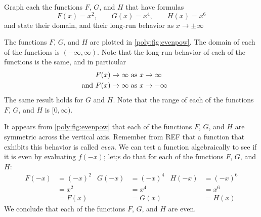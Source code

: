 \begin{pccexample}\label{poly:ex:evenpow}%
	Graph each the functions $F$, $G$, and $H$ that 
	have formulas
	\[
		F(x)=x^2, \qquad G(x)=x^4, \qquad H(x)=x^6
	\]
	and  state their domain, and their long-run behavior as $x\rightarrow\pm\infty$
	\begin{pccsolution}
		The functions $F$, $G$, and $H$ are plotted in \cref{poly:fig:evenpow}. The domain
		of each of the functions is $(-\infty,\infty)$. Note that the long-run behavior 
		of each of the functions is the same, and in particular
		\begin{align*}
			F(x)\rightarrow\infty                          & \text{ as } x\rightarrow\infty  \\ 
			\mathllap{\text{and }}   F(x)\rightarrow\infty & \text{ as } x\rightarrow-\infty 
		\end{align*}
		The same result holds for $G$ and $H$. Note that the range of each of 
		the functions $F$, $G$, and $H$ is $[0,\infty)$.
		
		It appears from \cref{poly:fig:evenpow} that each of the functions $F$, $G$, 
		and $H$ are symmetric across the vertical axis. Remember from REF 
		that a function that exhibits this behavior is called \emph{even}. We can 
		test a function algebraically to see if it is even by evaluating $f(-x)$; let;s
		do that for each of the functions $F$, $G$, and $H$:
		\begin{align*}
			F(-x) & =(-x)^2 & G(-x) & =(-x)^4 & H(-x) & =(-x)^6 \\ 
			      & =x^2    &       & =x^4    &       & =x^6    \\    
			      & =F(x)   &       & =G(x)   &       & =H(x)   
		\end{align*}
		We conclude that each of the functions $F$, $G$, and $H$ are even.
	\end{pccsolution}
\end{pccexample}

